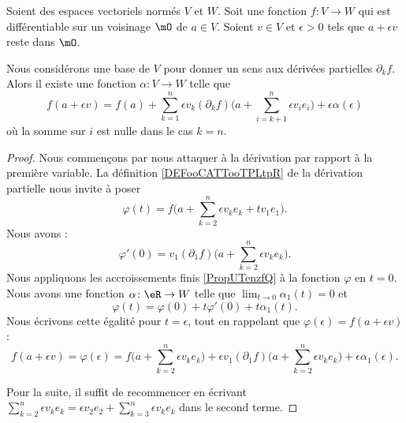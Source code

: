 \begin{lemma}       \label{LEMooNMTAooLgMkgH}
	Soient des espaces vectoriels normés \( V\) et \( W\). Soit une fonction \( f\colon V\to W\) qui est différentiable sur un voisinage \( \mO\) de \( a\in V\). Soient \( v\in V\) et \( \epsilon>0\) tels que \(a+\epsilon v\) reste dans \( \mO\).

	Nous considérons une base de \( V\) pour donner un sens aux dérivées partielles \( \partial_kf\). Alors il existe une fonction \( \alpha\colon V\to W\) telle que
	\begin{equation}
		f(a+\epsilon v)=f(a)+\sum_{k=1}^n\epsilon v_k (\partial_kf)\big( a+\sum_{i=k+1}^n\epsilon v_ie_i \big)+\epsilon\alpha(\epsilon)
	\end{equation}
	où la somme sur \( i\) est nulle dans le cas \( k=n\).
\end{lemma}

\begin{proof}
	Nous commençons par nous attaquer à la dérivation par rapport à la première variable. La définition \ref{DEFooCATTooTPLtpR} de la dérivation partielle nous invite à poser
	\begin{equation}
		\varphi(t)=f\big( a+\sum_{k=2}^n\epsilon v_ke_k+tv_1e_1 \big).
	\end{equation}
	Nous avons :
	\begin{equation}
		\varphi'(0)=v_1(\partial_1f)\big( a+\sum_{k=2}^n\epsilon v_ke_k \big).
	\end{equation}
	Nous appliquons les accroissements finis \ref{PropUTenzfQ} à la fonction \( \varphi\) en \( t=0\). Nous avons une fonction \( \alpha\colon \eR\to W\) telle que \( \lim_{t\to 0} \alpha_1(t)=0\) et
	\begin{equation}
		\varphi(t)=\varphi(0)+t\varphi'(0)+t\alpha_1(t).
	\end{equation}
	Nous écrivons cette égalité pour \( t=\epsilon\), tout en rappelant que \( \varphi(\epsilon)=f(a+\epsilon v)\) :
	\begin{equation}
		f(a+\epsilon v) =  \varphi(\epsilon)=f\big( a+\sum_{k=2}^n\epsilon v_ke_k \big)+\epsilon v_1(\partial_1f)\big( a+\sum_{k=2}^n \epsilon v_ke_k \big)+\epsilon \alpha_1(\epsilon).
	\end{equation}

	Pour la suite, il suffit de recommencer en écrivant \( \sum_{k=2}^n \epsilon v_ke_k=\epsilon v_2 e_2+\sum_{k=3}^n\epsilon v_k e_k\) dans le second terme.
\end{proof}

